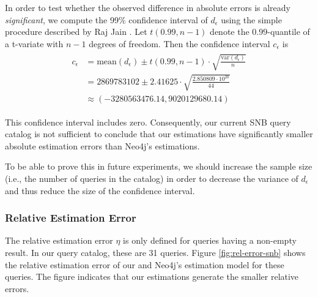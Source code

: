 In order to test whether the observed difference in absolute errors is already
\emph{significant}, we compute the 99\% confidence interval of $d_\epsilon$
using the simple procedure described by Raj Jain \cite[p.~209]{jain_art_1991}.
Let $t(0.99, n-1)$ denote the $0.99$-quantile of a t-variate with $n-1$
degrees of freedom. Then the confidence interval $c_\epsilon$ is
\begin{align}
\begin{split}
  c_\epsilon &= \text{mean}(d_\epsilon) \pm t(0.99, n - 1)
                 \cdot \sqrt{\frac{\text{var}(d_\epsilon)}{n}} \\
             &= 2869783102 \pm 2.41625
                \cdot \sqrt{\frac{2.850809 \cdot 10^{20}}{44}} \\
             &\approx (-3280563476.14, 9020129680.14)
\end{split}
\end{align}

This confidence interval includes zero. Consequently, our current SNB query catalog
is not sufficient to conclude that our estimations have significantly smaller absolute
estimation errors than Neo4j's estimations.

To be able to prove this in future experiments, we should increase the sample
size (i.e., the number of queries in the catalog) in order to decrease the
variance of $d_\epsilon$ and thus reduce the size of the confidence interval.

\subsubsection{Relative Estimation Error}

The relative estimation error $\eta$ is only defined for queries having a
non-empty result. In our query catalog, these are 31 queries.
Figure \ref{fig:rel-error-snb} shows the relative estimation error
of our and Neo4j's estimation model for these queries.
The figure indicates that our estimations generate the smaller relative errors.

